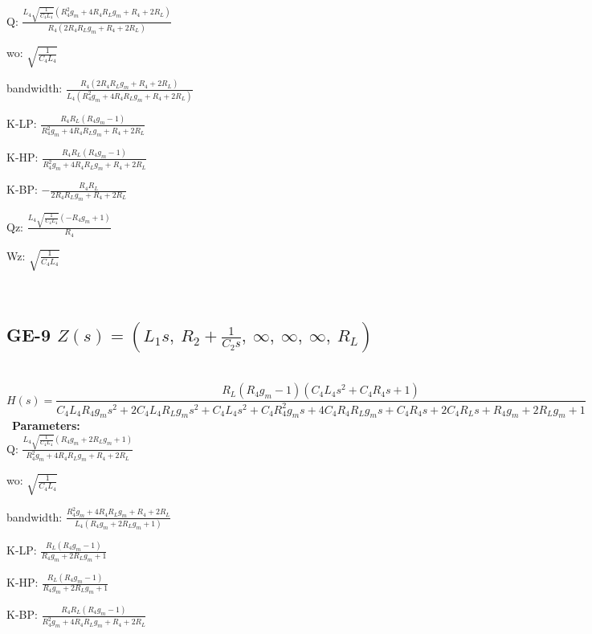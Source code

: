 \documentclass{article}
\begin{document}
Q: $\frac{L_{4} \sqrt{\frac{1}{C_{4} L_{4}}} \left(R_{4}^{2} g_{m} + 4 R_{4} R_{L} g_{m} + R_{4} + 2 R_{L}\right)}{R_{4} \left(2 R_{4} R_{L} g_{m} + R_{4} + 2 R_{L}\right)}$\ 

wo: $\sqrt{\frac{1}{C_{4} L_{4}}}$\ 

bandwidth: $\frac{R_{4} \left(2 R_{4} R_{L} g_{m} + R_{4} + 2 R_{L}\right)}{L_{4} \left(R_{4}^{2} g_{m} + 4 R_{4} R_{L} g_{m} + R_{4} + 2 R_{L}\right)}$\ 

K-LP: $\frac{R_{4} R_{L} \left(R_{4} g_{m} - 1\right)}{R_{4}^{2} g_{m} + 4 R_{4} R_{L} g_{m} + R_{4} + 2 R_{L}}$\ 

K-HP: $\frac{R_{4} R_{L} \left(R_{4} g_{m} - 1\right)}{R_{4}^{2} g_{m} + 4 R_{4} R_{L} g_{m} + R_{4} + 2 R_{L}}$\ 

K-BP: $- \frac{R_{4} R_{L}}{2 R_{4} R_{L} g_{m} + R_{4} + 2 R_{L}}$\ 

Qz: $\frac{L_{4} \sqrt{\frac{1}{C_{4} L_{4}}} \left(- R_{4} g_{m} + 1\right)}{R_{4}}$\ 

Wz: $\sqrt{\frac{1}{C_{4} L_{4}}}$\ 

\ 

\subsection{GE-9 $Z(s) = \left( L_{1} s, \  R_{2} + \frac{1}{C_{2} s}, \  \infty, \  \infty, \  \infty, \  R_{L}\right)$ } \ 
\textbf{\[H(s) = \frac{R_{L} \left(R_{4} g_{m} - 1\right) \left(C_{4} L_{4} s^{2} + C_{4} R_{4} s + 1\right)}{C_{4} L_{4} R_{4} g_{m} s^{2} + 2 C_{4} L_{4} R_{L} g_{m} s^{2} + C_{4} L_{4} s^{2} + C_{4} R_{4}^{2} g_{m} s + 4 C_{4} R_{4} R_{L} g_{m} s + C_{4} R_{4} s + 2 C_{4} R_{L} s + R_{4} g_{m} + 2 R_{L} g_{m} + 1}\] } \ 
\textbf{Parameters:}\\ 

Q: $\frac{L_{4} \sqrt{\frac{1}{C_{4} L_{4}}} \left(R_{4} g_{m} + 2 R_{L} g_{m} + 1\right)}{R_{4}^{2} g_{m} + 4 R_{4} R_{L} g_{m} + R_{4} + 2 R_{L}}$\ 

wo: $\sqrt{\frac{1}{C_{4} L_{4}}}$\ 

bandwidth: $\frac{R_{4}^{2} g_{m} + 4 R_{4} R_{L} g_{m} + R_{4} + 2 R_{L}}{L_{4} \left(R_{4} g_{m} + 2 R_{L} g_{m} + 1\right)}$\ 

K-LP: $\frac{R_{L} \left(R_{4} g_{m} - 1\right)}{R_{4} g_{m} + 2 R_{L} g_{m} + 1}$\ 

K-HP: $\frac{R_{L} \left(R_{4} g_{m} - 1\right)}{R_{4} g_{m} + 2 R_{L} g_{m} + 1}$\ 

K-BP: $\frac{R_{4} R_{L} \left(R_{4} g_{m} - 1\right)}{R_{4}^{2} g_{m} + 4 R_{4} R_{L} g_{m} + R_{4} + 2 R_{L}}$\ 
\end{document}
